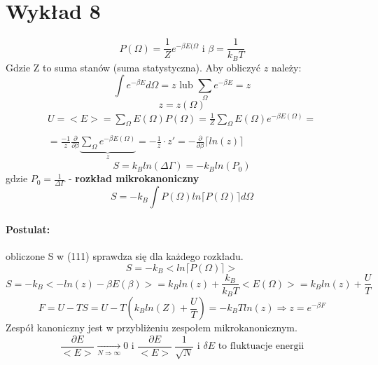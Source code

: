 \documentclass{article}
\begin{document}
	\section{Wykład 8}
		\begin{equation}
		P(\Omega) = \frac{1}{Z}e^{-\beta E(\Omega} \text{ i } \beta = \frac{1}{k_BT}
		\end{equation}
		Gdzie Z to suma stanów (suma statystyczna). Aby obliczyć $ z $ należy:
		\begin{equation}
		\int e^{-\beta E}d\Omega = z \text{ lub } \sum_{\Omega}^{} e^{-\beta E} = z
		\end{equation}
		\begin{equation}
		z = z(\Omega)
		\end{equation}
		\begin{equation}
		\begin{array}{cc}
		U = <E> = \sum_{\Omega}^{}E(\Omega)P(\Omega) = \frac{1}{Z}\sum_{\Omega}^{}E(\Omega)e^{-\beta E(\Omega)} =\\ \\
		=\frac{-1}{z}\frac{\partial }{\partial \beta} \underbrace{\sum_{\Omega}^{}e^{-\beta E(\Omega)}}_{z} = -\frac{1}{z} \cdot z' = -\frac{\partial}{\partial \beta} \lceil ln(z) \rceil
		\end{array}{}
		\end{equation}
		\begin{equation}
		S = k_B ln(\Delta \Gamma) = -k_Bln(P_0)
		\end{equation}
		gdzie $ P_0 = \frac{1}{\Delta \Gamma} $ - \textbf{rozkład mikrokanoniczny}
		\begin{equation}
		S = -k_B \int P(\Omega) ln\lceil P(\Omega) \rceil d\Omega
		\end{equation}
		\paragraph{Postulat:} obliczone S w (111) sprawdza się dla każdego rozkładu.
		\begin{equation}
		S = -k_B<ln\lceil P(\Omega) \rceil>
		\end{equation}
		\begin{equation}
		S = -k_B<-ln(z) - \beta E(\beta)> = k_Bln(z) + \frac{k_B}{k_BT}<E(\Omega)> = k_Bln(z) + \frac{U}{T}
		\end{equation}
		\begin{equation}
		F = U - TS = U - T(k_Bln(Z) + \frac{U}{T}) = - k_BTln(z) \Rightarrow z = e^{-\beta F}
		\end{equation}
		Zespół kanoniczny jest w przybliżeniu zespołem mikrokanonicznym.
		\begin{equation}
		\frac{\partial E}{<E>} \xrightarrow[N \Rightarrow \infty]{} 0 \text{ i } \frac{\partial E}{<E>} ~ \frac{1}{\sqrt{N}} \text{ i } \delta E \text{ to fluktuacje energii}
		\end{equation}
\end{document}
